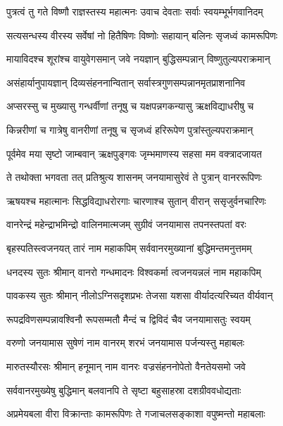 
\twolineshloka
{पुत्रत्वं तु गते विष्णौ राज्ञस्तस्य महात्मनः}
{उवाच देवताः सर्वाः स्वयम्भूर्भगवानिदम्} %

\twolineshloka
{सत्यसन्धस्य वीरस्य सर्वेषां नो हितैषिणः}
{विष्णोः सहायान् बलिनः सृजध्वं कामरूपिणः} %

\twolineshloka
{मायाविदश्च शूरांश्च वायुवेगसमान् जवे}
{नयज्ञान् बुद्धिसम्पन्नान् विष्णुतुल्यपराक्रमान्} %

\twolineshloka
{असंहार्यानुपायज्ञान् दिव्यसंहननान्वितान्}
{सर्वास्त्रगुणसम्पन्नानमृतप्राशनानिव} %

\twolineshloka
{अप्सरस्सु च मुख्यासु गन्धर्वीणां तनूषु च}
{यक्षपन्नगकन्यासु ऋक्षविद्याधरीषु च} %

\twolineshloka
{किन्नरीणां च गात्रेषु वानरीणां तनूषु च}
{सृजध्वं हरिरूपेण पुत्रांस्तुल्यपराक्रमान्} %

\twolineshloka
{पूर्वमेव मया सृष्टो जाम्बवान् ऋक्षपुङ्गवः}
{जृम्भमाणस्य सहसा मम वक्त्रादजायत} %

\twolineshloka
{ते तथोक्ता भगवता तत् प्रतिश्रुत्य शासनम्}
{जनयामासुरेवं ते पुत्रान् वानररूपिणः} %

\twolineshloka
{ऋषयश्च महात्मानः सिद्धविद्याधरोरगाः}
{चारणाश्च सुतान् वीरान् ससृजुर्वनचारिणः} %

\twolineshloka
{वानरेन्द्रं महेन्द्राभमिन्द्रो वालिनमात्मजम्}
{सुग्रीवं जनयामास तपनस्तपतां वरः} %

\twolineshloka
{बृहस्पतिस्त्वजनयत् तारं नाम महाकपिम्}
{सर्ववानरमुख्यानां बुद्धिमन्तमनुत्तमम्} %

\twolineshloka
{धनदस्य सुतः श्रीमान् वानरो गन्धमादनः}
{विश्वकर्मा त्वजनयन्नलं नाम महाकपिम्} %

\twolineshloka
{पावकस्य सुतः श्रीमान् नीलोऽग्निसदृशप्रभः}
{तेजसा यशसा वीर्यादत्यरिच्यत वीर्यवान्} %

\twolineshloka
{रूपद्रविणसम्पन्नावश्विनौ रूपसम्मतौ}
{मैन्दं च द्विविदं चैव जनयामासतुः स्वयम्} %

\twolineshloka
{वरुणो जनयामास सुषेणं नाम वानरम्}
{शरभं जनयामास पर्जन्यस्तु महाबलः} %

\twolineshloka
{मारुतस्यौरसः श्रीमान् हनूमान् नाम वानरः}
{वज्रसंहननोपेतो वैनतेयसमो जवे} %

\twolineshloka
{सर्ववानरमुख्येषु बुद्धिमान् बलवानपि}
{ते सृष्टा बहुसाहस्रा दशग्रीववधोद्यताः} %

\twolineshloka
{अप्रमेयबला वीरा विक्रान्ताः कामरूपिणः}
{ते गजाचलसङ्काशा वपुष्मन्तो महाबलाः} %

